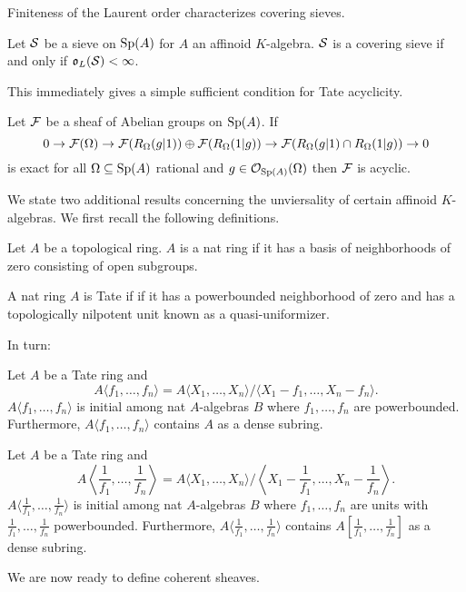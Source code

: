 Finiteness of the Laurent order characterizes covering sieves. 
\begin{proposition}\label{prop: finite Laurent order iff covering}
    Let $\mathcal{S}$ be a sieve on $\mathrm{Sp}(A)$ for $A$ an affinoid $K$-algebra. $\mathcal{S}$ is a covering sieve if and only if $\mathfrak{o}_{L}(\mathcal{S})<\infty$. 
\end{proposition}
This immediately gives a simple sufficient condition for Tate acyclicity. 
\begin{corollary}\label{def: two set condition for acyclicity}
    Let $\mathcal{F}$ be a sheaf of Abelian groups on $\mathrm{Sp}(A)$. If 
    $$0\to\mathcal{F}(\Omega)\to\mathcal{F}(R_{\Omega}(g|1))\oplus\mathcal{F}(R_{\Omega}(1|g))\to\mathcal{F}(R_{\Omega}(g|1)\cap R_{\Omega}(1|g))\to0$$
    is exact for all $\Omega\subseteq\mathrm{Sp}(A)$ rational and $g\in\mathcal{O}_{\mathrm{Sp}(A)}(\Omega)$ then $\mathcal{F}$ is acyclic. 
\end{corollary}
We state two additional results concerning the unviersality of certain affinoid $K$-algebras. We first recall the following definitions. 
\begin{definition}\label{def: nat ring}
    Let $A$ be a topological ring. $A$ is a nat ring if it has a basis of neighborhoods of zero consisting of open subgroups. 
\end{definition}
\begin{definition}\label{def: Tate ring}
    A nat ring $A$ is Tate if if it has a powerbounded neighborhood of zero and has a topologically nilpotent unit known as a quasi-uniformizer. 
\end{definition}
In turn:
\begin{proposition}\label{prop: unviersality of quotients}
    Let $A$ be a Tate ring and 
    $$A\langle f_{1},\dots,f_{n}\rangle=A\langle X_{1},\dots,X_{n}\rangle/\langle X_{1}-f_{1},\dots,X_{n}-f_{n}\rangle.$$
    $A\langle f_{1},\dots,f_{n}\rangle$ is initial among nat $A$-algebras $B$ where $f_{1},\dots,f_{n}$ are powerbounded. Furthermore, $A\langle f_{1},\dots,f_{n}\rangle$ contains $A$ as a dense subring. 
\end{proposition}
\begin{proposition}\label{prop: universality of localizations}
    Let $A$ be a Tate ring and 
    $$A\left\langle\frac{1}{f_{1}},\dots,\frac{1}{f_{n}}\right\rangle=A\langle X_{1},\dots,X_{n}\rangle/\left\langle X_{1}-\frac{1}{f_{1}},\dots,X_{n}-\frac{1}{f_{n}}\right\rangle.$$
    $A\langle\frac{1}{f_{1}},\dots,\frac{1}{f_{n}}\rangle$ is initial among nat $A$-algebras $B$ where $f_{1},\dots,f_{n}$ are units with $\frac{1}{f_{1}},\dots,\frac{1}{f_{n}}$ powerbounded. Furthermore, $A\langle\frac{1}{f_{1}},\dots,\frac{1}{f_{n}}\rangle$ contains $A[\frac{1}{f_{1}},\dots,\frac{1}{f_{n}}]$ as a dense subring. 
\end{proposition}
We are now ready to define coherent sheaves. 

